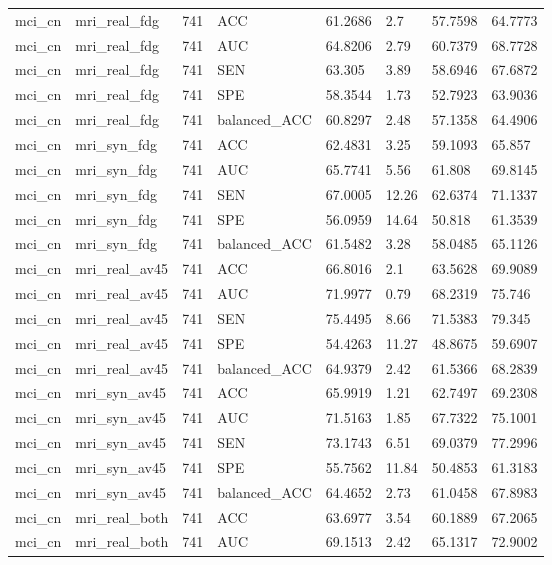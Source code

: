 \begin{landscape}
\begin{longtable}{llllllll}
mci\_cn & mri\_real\_fdg & 741 & ACC & 61.2686 & 2.7 & 57.7598 & 64.7773 \\
mci\_cn & mri\_real\_fdg & 741 & AUC & 64.8206 & 2.79 & 60.7379 & 68.7728 \\
mci\_cn & mri\_real\_fdg & 741 & SEN & 63.305 & 3.89 & 58.6946 & 67.6872 \\
mci\_cn & mri\_real\_fdg & 741 & SPE & 58.3544 & 1.73 & 52.7923 & 63.9036 \\
mci\_cn & mri\_real\_fdg & 741 & balanced\_ACC & 60.8297 & 2.48 & 57.1358 & 64.4906 \\
mci\_cn & mri\_syn\_fdg & 741 & ACC & 62.4831 & 3.25 & 59.1093 & 65.857 \\
mci\_cn & mri\_syn\_fdg & 741 & AUC & 65.7741 & 5.56 & 61.808 & 69.8145 \\
mci\_cn & mri\_syn\_fdg & 741 & SEN & 67.0005 & 12.26 & 62.6374 & 71.1337 \\
mci\_cn & mri\_syn\_fdg & 741 & SPE & 56.0959 & 14.64 & 50.818 & 61.3539 \\
mci\_cn & mri\_syn\_fdg & 741 & balanced\_ACC & 61.5482 & 3.28 & 58.0485 & 65.1126 \\
mci\_cn & mri\_real\_av45 & 741 & ACC & 66.8016 & 2.1 & 63.5628 & 69.9089 \\
mci\_cn & mri\_real\_av45 & 741 & AUC & 71.9977 & 0.79 & 68.2319 & 75.746 \\
mci\_cn & mri\_real\_av45 & 741 & SEN & 75.4495 & 8.66 & 71.5383 & 79.345 \\
mci\_cn & mri\_real\_av45 & 741 & SPE & 54.4263 & 11.27 & 48.8675 & 59.6907 \\
mci\_cn & mri\_real\_av45 & 741 & balanced\_ACC & 64.9379 & 2.42 & 61.5366 & 68.2839 \\
mci\_cn & mri\_syn\_av45 & 741 & ACC & 65.9919 & 1.21 & 62.7497 & 69.2308 \\
mci\_cn & mri\_syn\_av45 & 741 & AUC & 71.5163 & 1.85 & 67.7322 & 75.1001 \\
mci\_cn & mri\_syn\_av45 & 741 & SEN & 73.1743 & 6.51 & 69.0379 & 77.2996 \\
mci\_cn & mri\_syn\_av45 & 741 & SPE & 55.7562 & 11.84 & 50.4853 & 61.3183 \\
mci\_cn & mri\_syn\_av45 & 741 & balanced\_ACC & 64.4652 & 2.73 & 61.0458 & 67.8983 \\
mci\_cn & mri\_real\_both & 741 & ACC & 63.6977 & 3.54 & 60.1889 & 67.2065 \\
mci\_cn & mri\_real\_both & 741 & AUC & 69.1513 & 2.42 & 65.1317 & 72.9002 \\

\end{longtable}
\end{landscape}
